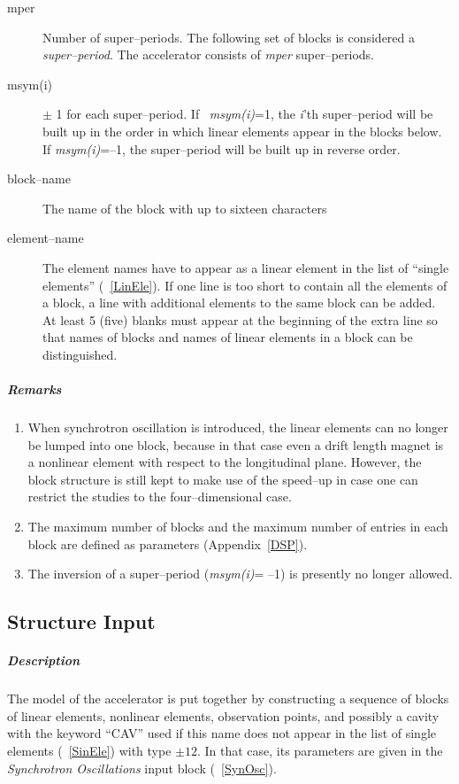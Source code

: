 \documentclass[a4paper,11pt]{report}
\begin{document}
\begin{description}
\item [mper] Number of super--periods. The following set of blocks is
  considered a {\em super--period}\/. The accelerator consists of {\em
    mper} \/super--periods.
\item [msym(i)] $\pm$ 1 for each super--period.  If \mbox{{\em
      msym(i)}=1,} \/the \mbox{{\em i}\/'th} super--period will be
  built up in the order in which linear elements appear in the blocks
  below. If {\em msym(i)}\/=--1, the super--period will be built up in
  reverse order.
\item [block--name] The name of the block with up to sixteen
  characters
\item [element--name] The element names have to appear as a linear
  element in the list of ``single elements'' (~\ref{LinEle}). If one
  line is too short to contain all the elements of a block, a line
  with additional elements to the same block can be added.  At least 5
  (five) blanks must appear at the beginning of the extra line so that
  names of blocks and names of linear elements in a block can be
  distinguished.
\end{description}

\subparagraph{Remarks}
\begin{enumerate}
\item When synchrotron oscillation is introduced, the linear elements
  can no longer be lumped into one block, because in that case even a
  drift length magnet is a nonlinear element with respect to the
  longitudinal plane. However, the block structure is still kept to
  make use of the speed--up in case one can restrict the studies to
  the four--dimensional case.
\item The maximum number of blocks and the maximum number of entries
  in each block are defined as parameters (Appendix~\ref{DSP}).
\item The inversion of a super--period ({\em msym(i)}\/= --1) is
  presently no longer allowed.
\end{enumerate}

\subsection{Structure Input} \label{StrInp}

\subparagraph{Description} The model of the accelerator is put
together by constructing a sequence of blocks of linear elements,
nonlinear elements, observation points, and possibly a cavity with the
keyword ``CAV'' used if this name does not appear in the list of
single elements (~\ref{SinEle}) with type $\pm 12$. In that case, its
parameters are given in the {\em Synchrotron Oscillations} \/input
block (~\ref{SynOsc}).
\end{document}
